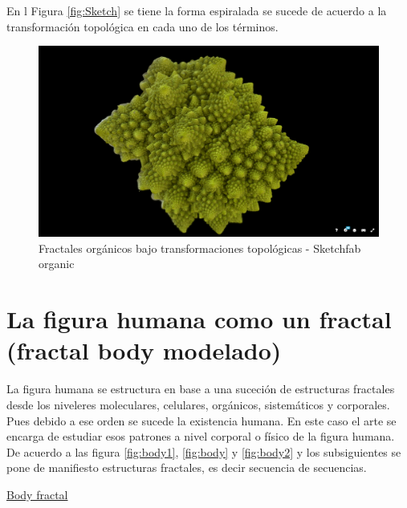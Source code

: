 \documentclass[
  11pt,
]{krantz}
\theoremstyle{definition}
\theoremstyle{definition}
\theoremstyle{definition}
\theoremstyle{definition}
\theoremstyle{remark}
\begin{document}
En l Figura \ref{fig:Sketch} se tiene la forma espiralada se sucede de acuerdo a la transformación topológica en cada uno de los términos.

\begin{figure}[!ht]

{\centering \includegraphics[width=1\linewidth]{Sketch2} 

}

\caption{Fractales orgánicos bajo transformaciones topológicas - Sketchfab organic}\label{fig:Sketch2}
\end{figure}

\hypertarget{la-figura-humana-como-un-fractal-fractal-body-modelado}{%
\section{La figura humana como un fractal (fractal body modelado)}\label{la-figura-humana-como-un-fractal-fractal-body-modelado}}

La figura humana se estructura en base a una suceción de estructuras fractales desde los niveleres moleculares, celulares, orgánicos, sistemáticos y corporales. Pues debido a ese orden se sucede la existencia humana. En este caso el arte se encarga de estudiar esos patrones a nivel corporal o físico de la figura humana. De acuerdo a las figura \ref{fig:body1}, \ref{fig:body} y \ref{fig:body2} y los subsiguientes se pone de manifiesto estructuras fractales, es decir secuencia de secuencias.

\href{https://www.behance.net/gallery/11339339/FRACTAL-BODY}{Body fractal}
\end{document}
